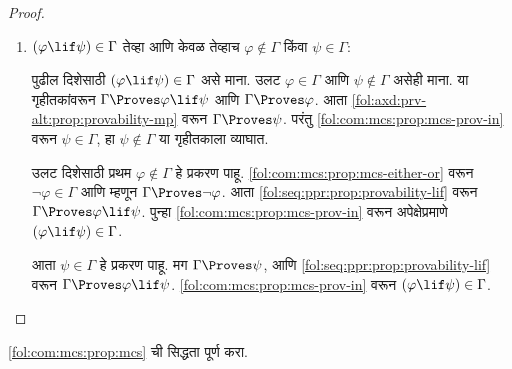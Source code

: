 \begin{proof}
\begin{enumerate}
पुढील दिशेचा प्रतिव्यत्यास सिद्ध करण्यासाठी $\varphi \notin \Gamma$
आणि $\psi \notin \Gamma$ असे माना. आपल्याला $(\varphi \lor \psi)
\notin \Gamma$ दाखवायचे आहे. $\Gamma$ महत्तम सुसंगत असल्यामुळे
$\Gamma \cup \{\varphi\} \Proves \lfalse$ आणि
$\Gamma \cup \{\psi\} \Proves \lfalse$. आता
\ref{fol:axd:prv-alt:prop:provability-lor-left}
वरून $\Gamma \cup \{(\varphi \lor \psi)\}$ विसंगत ठरतो. म्हणून
अपेक्षेप्रमाणे $(\varphi \lor \psi) \notin \Gamma$.

उलट दिशेसाठी $\varphi \in \Gamma$ किंवा $\psi \in \Gamma$ असे
माना. मग $\Gamma \Proves \varphi$ किंवा $\Gamma \Proves \psi$. आता
\ref{fol:axd:prv-alt:prop:provability-lor-right}
वरून $\Gamma \Proves \varphi \lor \psi$. \ref{fol:com:mcs:prop:mcs-prov-in}
वरून अपेक्षेप्रमाणे $(\varphi \lor \psi) \in \Gamma$.

\item

$(\varphi \lif \psi) \in \Gamma$ तेव्हा आणि केवळ तेव्हाच
$\varphi \notin \Gamma$ किंवा $\psi \in \Gamma$:

पुढील दिशेसाठी $(\varphi \lif \psi) \in \Gamma$ असे माना.
उलट $\varphi \in \Gamma$ आणि $\psi \notin \Gamma$ असेही माना.
या गृहीतकांवरून $\Gamma \Proves \varphi \lif \psi$ आणि
$\Gamma \Proves \varphi$. आता
\ref{fol:axd:prv-alt:prop:provability-mp}
वरून $\Gamma \Proves \psi$. परंतु \ref{fol:com:mcs:prop:mcs-prov-in} वरून
$\psi \in \Gamma$, हा $\psi \notin \Gamma$ या गृहीतकाला व्याघात.

उलट दिशेसाठी प्रथम $\varphi \notin \Gamma$ हे प्रकरण पाहू.
\ref{fol:com:mcs:prop:mcs-either-or} वरून $\lnot \varphi \in \Gamma$ आणि म्हणून
$\Gamma \Proves \lnot \varphi$. आता
\ref{fol:seq:ppr:prop:provability-lif}
वरून $\Gamma \Proves \varphi \lif \psi$.
पुन्हा \ref{fol:com:mcs:prop:mcs-prov-in} वरून अपेक्षेप्रमाणे
$(\varphi \lif \psi) \in \Gamma$.

आता $\psi \in \Gamma$ हे प्रकरण पाहू. मग $\Gamma \Proves \psi$,
आणि
\ref{fol:seq:ppr:prop:provability-lif}
वरून $\Gamma \Proves \varphi \lif \psi$. \ref{fol:com:mcs:prop:mcs-prov-in}
वरून $(\varphi \lif \psi) \in \Gamma$.
\end{enumerate}
\end{proof}

\begin{prob}
\ref{fol:com:mcs:prop:mcs} ची सिद्धता पूर्ण करा.
\end{prob}












